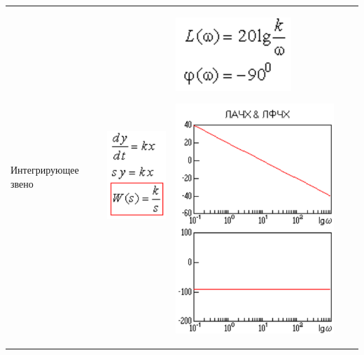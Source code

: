 \documentclass[14pt,a4paper,report]{report}
\begin{document}
\begin{table}[h!]
	\centering
	\bgroup
	\def\arraystretch{3}
	\begin{tabular}{ | m{3cm} | m{3.5cm} | m{4.5cm} | m{2.5cm} | m{2.5cm} }
		\hline
		Интегрирующее звено
		&
		\begin{minipage}{.3\textwidth}
			\includegraphics[scale = 0.5]{images/3_2.png}
		\end{minipage}
		&
		\begin{minipage}{.3\textwidth}
			\includegraphics[scale = 0.5]{images/3_3_f.png}
		\end{minipage}
		\begin{minipage}{.3\textwidth}
			\includegraphics[scale = 0.5]{images/3_3.png}

\end{minipage}
\end{tabular}
\end{table}
\end{document}
